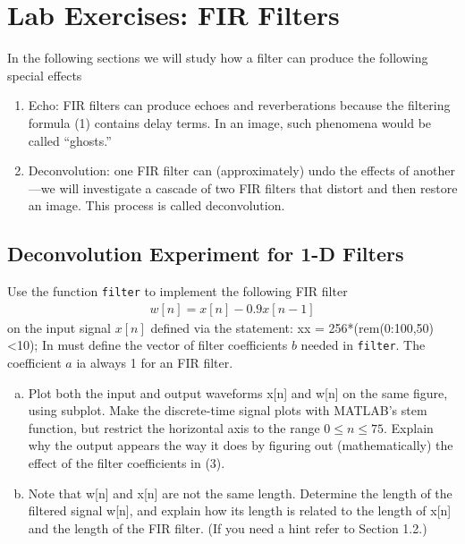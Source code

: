 \section{Lab Exercises: FIR Filters}
In the following sections we will study how a filter can produce the following special effects
\begin{enumerate}[1)]
	\item Echo: FIR filters can produce echoes and reverberations because the filtering formula (1) contains delay terms. In an image, such phenomena would be called “ghosts.”
	\item Deconvolution: one FIR filter can (approximately) undo the effects of another—we will investigate a 	cascade of two FIR filters that distort and then restore an image. This process is called deconvolution.
\end{enumerate}

\subsection{Deconvolution Experiment for 1-D Filters}
Use the function \verb|filter| to implement the following FIR filter
\begin{align}
	w[n] = x[n] - 0.9x[n-1]
\end{align}
on the input signal $x[n]$ defined via the statement: xx = 256*(rem(0:100,50)<10); 
In \scipy must define the vector of filter coefficients $b$ needed in \verb|filter|. The coefficient $a$ ia always 1 for an FIR filter.
\begin{enumerate}[a)]
\item Plot both the input and output waveforms x[n] and w[n] on the same figure, using subplot. Make
	the discrete-time signal plots with MATLAB’s stem function, but restrict the horizontal axis to the
	range $0 \le n \le 75$. Explain why the output appears the way it does by figuring out (mathematically)
	the effect of the filter coefficients in (3).
	
\item Note that w[n] and x[n] are not the same length. Determine the length of the filtered signal w[n], and explain how its length is related to the length of x[n] and the length of the FIR filter. (If you need a hint refer to Section 1.2.)	
\end{enumerate}

